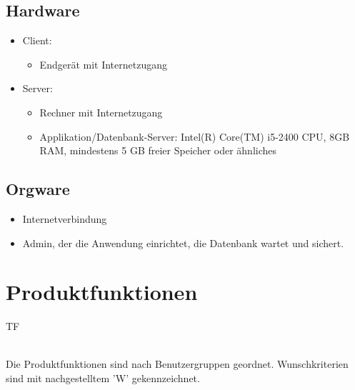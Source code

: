 \documentclass[a4paper]{scrreprt}
\newcounter{Lc}
\newcounter{Hc}
\newcommand{\resetAllCounter}{\setcounter{Lc}{0}\setcounter{Hc}{1}}
\begin{document}
    \section{Hardware}   
        \begin{itemize}
          	\item Client:
	            \begin{itemize}
	            	\item Endgerät mit Internetzugang
	            \end{itemize}
          	\item Server:
	           \begin{itemize}
		           	\item Rechner mit Internetzugang
		           	\item Applikation/Datenbank-Server: Intel(R) Core(TM) i5-2400 CPU, 8GB
RAM, mindestens 5 GB freier Speicher oder ähnliches
	           \end{itemize}
        \end{itemize}
        
     \section{Orgware}
             \begin{itemize}
               \item Internetverbindung
               \item \gls{Admin}, der die Anwendung einrichtet, die Datenbank wartet
und sichert.
             \end{itemize}

\resetAllCounter
\newcommand{\Func}[1]{\stepcounter{Lc}\textcolor{Blue}{\textbf{/F\arabic{Hc}0-\arabic{Lc}0/} #1} \\}
\newcommand{\FuncW}[1]{\stepcounter{Lc}\textcolor{Green}{\textbf{/F\arabic{Hc}0-\arabic{Lc}0W/} #1} \\}
\newcommand{\FuncBlue}[1]{\textcolor{Blue}{\textbf{#1}}}
\newcommand{\FuncGreen}[1]{\textcolor{Green}{\textbf{#1}}}

\chapter{Produktfunktionen}
\begin{tiny}
	TF\\
\end{tiny}
\ \\
Die Produktfunktionen sind nach Benutzergruppen geordnet. Wunschkriterien sind mit nachgestelltem 'W' gekennzeichnet.
\end{document}
